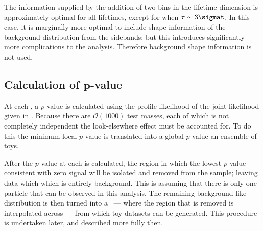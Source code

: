 The information supplied by the addition of two bins in the lifetime dimension is approximately
optimal for all \db lifetimes, except for when $\tau\sim3\sigmat$.
In this case, it is marginally more optimal to include shape information of the background
distribution from the sidebands; but this introduces
significantly more complications to the analysis.
Therefore background shape information is not used.


\subsection[Calculation of $p$-value]
{Calculation of $\boldsymbol{p}$-value}
\label{sec:db:pval}
At each , a $p$-value is calculated using the profile likelihood of the joint likelihood
given in .
Because there are $\mathcal{O}(1000)$ test masses, each of which is not completely independent the
look-elsewhere effect must be accounted for.
To do this the minimum local $p$-value is translated into a global $p$-value an ensemble of toys.

After the $p$-value at each  is calculated, the region in which the lowest $p$-value
consistent with zero signal will be isolated and removed from the sample; leaving data which
which is entirely background.
This is assuming that there is only one \np particle that can be observed in this analysis.
The remaining background-like distribution is then turned into a \PDF\ --- where the region that is
removed is interpolated across --- from which toy datasets can be generated.
This procedure is undertaken later, and described more fully then.

